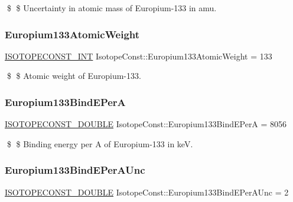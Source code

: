 \$ \$ Uncertainty in atomic mass of Europium-\/133 in amu. \mbox{\label{group___isotope_const-_europium-_eu133_ga3fd5edf36c666007bf1161c6a6427ea7}} 
\subsubsection{\texorpdfstring{Europium133\+Atomic\+Weight}{Europium133AtomicWeight}}
{\footnotesize\ttfamily \mbox{\hyperlink{group___isotope_const-_macros_ga5f18360b3e99483a35c32d789e62621c}{I\+S\+O\+T\+O\+P\+E\+C\+O\+N\+S\+T\+\_\+\+I\+NT}} Isotope\+Const\+::\+Europium133\+Atomic\+Weight = 133}

\$ \$ Atomic weight of Europium-\/133. \mbox{\label{group___isotope_const-_europium-_eu133_ga80284e2013b5798f7550387fe1d7380d}} 
\subsubsection{\texorpdfstring{Europium133\+Bind\+E\+PerA}{Europium133BindEPerA}}
{\footnotesize\ttfamily \mbox{\hyperlink{group___isotope_const-_macros_ga8f45a7272ce02c0b4c65c44636ed719a}{I\+S\+O\+T\+O\+P\+E\+C\+O\+N\+S\+T\+\_\+\+D\+O\+U\+B\+LE}} Isotope\+Const\+::\+Europium133\+Bind\+E\+PerA = 8056}

\$ \$ Binding energy per A of Europium-\/133 in keV. \mbox{\label{group___isotope_const-_europium-_eu133_ga8f15ed1c7ef13ee618a3a08d6d6723e8}} 
\subsubsection{\texorpdfstring{Europium133\+Bind\+E\+Per\+A\+Unc}{Europium133BindEPerAUnc}}
{\footnotesize\ttfamily \mbox{\hyperlink{group___isotope_const-_macros_ga8f45a7272ce02c0b4c65c44636ed719a}{I\+S\+O\+T\+O\+P\+E\+C\+O\+N\+S\+T\+\_\+\+D\+O\+U\+B\+LE}} Isotope\+Const\+::\+Europium133\+Bind\+E\+Per\+A\+Unc = 2}

